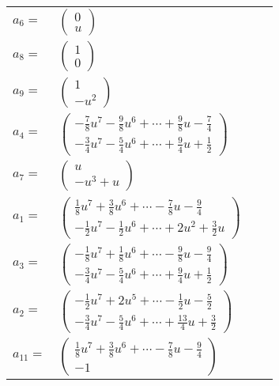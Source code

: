 \documentclass[1p]{elsarticle_modified}
\theoremstyle{definition}
\begin{document}
\begin{tabular}{m{7pt} m{180pt} m{7pt} m{180pt} }
\flushright $a_{6}=$&$\begin{pmatrix}0\\u\end{pmatrix}$ \\
\flushright $a_{8}=$&$\begin{pmatrix}1\\0\end{pmatrix}$ \\
\flushright $a_{9}=$&$\begin{pmatrix}1\\- u^2\end{pmatrix}$ \\
\flushright $a_{4}=$&$\begin{pmatrix}-\frac{7}{8} u^7-\frac{9}{8} u^6+\cdots+\frac{9}{8} u-\frac{7}{4}\\-\frac{3}{4} u^7-\frac{5}{4} u^6+\cdots+\frac{9}{4} u+\frac{1}{2}\end{pmatrix}$ \\
\flushright $a_{7}=$&$\begin{pmatrix}u\\- u^3+u\end{pmatrix}$ \\
\flushright $a_{1}=$&$\begin{pmatrix}\frac{1}{8} u^7+\frac{3}{8} u^6+\cdots-\frac{7}{8} u-\frac{9}{4}\\-\frac{1}{2} u^7-\frac{1}{2} u^6+\cdots+2 u^2+\frac{3}{2} u\end{pmatrix}$ \\
\flushright $a_{3}=$&$\begin{pmatrix}-\frac{1}{8} u^7+\frac{1}{8} u^6+\cdots-\frac{9}{8} u-\frac{9}{4}\\-\frac{3}{4} u^7-\frac{5}{4} u^6+\cdots+\frac{9}{4} u+\frac{1}{2}\end{pmatrix}$ \\
\flushright $a_{2}=$&$\begin{pmatrix}-\frac{1}{2} u^7+2 u^5+\cdots-\frac{1}{2} u-\frac{5}{2}\\-\frac{3}{4} u^7-\frac{5}{4} u^6+\cdots+\frac{13}{4} u+\frac{3}{2}\end{pmatrix}$ \\
\flushright $a_{11}=$&$\begin{pmatrix}\frac{1}{8} u^7+\frac{3}{8} u^6+\cdots-\frac{7}{8} u-\frac{9}{4}\\-1\end{pmatrix}$ \\

\end{tabular}
\end{document}
